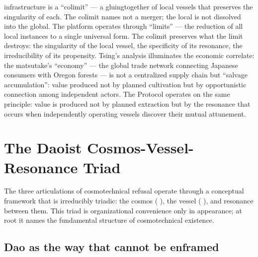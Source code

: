 infrastructure is a “colimit” — a gluingtogether of local vessels that preserves the singularity of each. The colimit names not a merger; the local is not dissolved into the global. The platform operates through “limits” — the reduction of all local instances to a single universal form. The colimit preserves what the limit destroys: the singularity of the local vessel, the specificity of its resonance, the irreducibility of its propensity. Tsing’s analysis illuminates the economic correlate: the matsutake’s “economy” — the global trade network connecting Japanese consumers with Oregon forests — is not a centralized supply chain but “salvage accumulation”: value produced not by planned cultivation but by opportunistic connection among independent actors. The  Protocol operates on the same principle: value is produced not by planned extraction but by the resonance that occurs when independently operating vessels discover their mutual attunement.

\section{The Daoist Cosmos-Vessel-Resonance Triad}

The three articulations of cosmotechnical refusal operate through a conceptual framework that is irreducibly triadic: the cosmos (  ), the vessel (  ), and resonance between them. This triad is organizational convenience only in appearance; at root it names the fundamental structure of cosmotechnical existence.

\subsection{Dao as the way that cannot be enframed}

